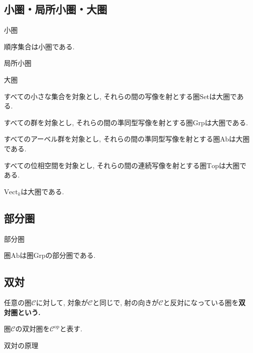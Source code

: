 \documentclass{jsbook}
\theoremstyle{plain}
\begin{document}
\subsection{小圏・局所小圏・大圏}
\begin{Def}
小圏
\end{Def}
\begin{example}
順序集合は小圏である.
\end{example}
\begin{Def}
局所小圏
\end{Def}
\begin{Def}
大圏
\end{Def}

\begin{example}
すべての小さな集合を対象とし, それらの間の写像を射とする圏$\mathrm{Set}$は大圏である.
\end{example}
\begin{example}
すべての群を対象とし, それらの間の準同型写像を射とする圏$\mathrm{Grp}$は大圏である.
\end{example}
\begin{example}
すべてのアーベル群を対象とし, それらの間の準同型写像を射とする圏$\mathrm{Ab}$は大圏である.
\end{example}
\begin{example}
すべての位相空間を対象とし, それらの間の連続写像を射とする圏$\mathrm{Top}$は大圏である.
\end{example}
\begin{example}
$\mathrm{Vect}_k$は大圏である.
\end{example}
\subsection{部分圏}
\begin{Def}
部分圏
\end{Def}
\begin{example}
圏$\mathrm{Ab}$は圏$\mathrm{Grp}$の部分圏である.
\end{example}
\subsection{双対}
\begin{Def}
任意の圏$\mathscr{C}$に対して, 対象が$\mathscr{C}$と同じで, 射の向きが$\mathcal{C}$と反対になっている圏を\bf{双対圏}という.
\end{Def}
\begin{Notation}
圏$\mathscr{C}$の双対圏を$\mathscr{C}^{\mathrm{op}}$と表す.
\end{Notation}
\begin{caution}
双対の原理
\end{caution}
\end{document}
